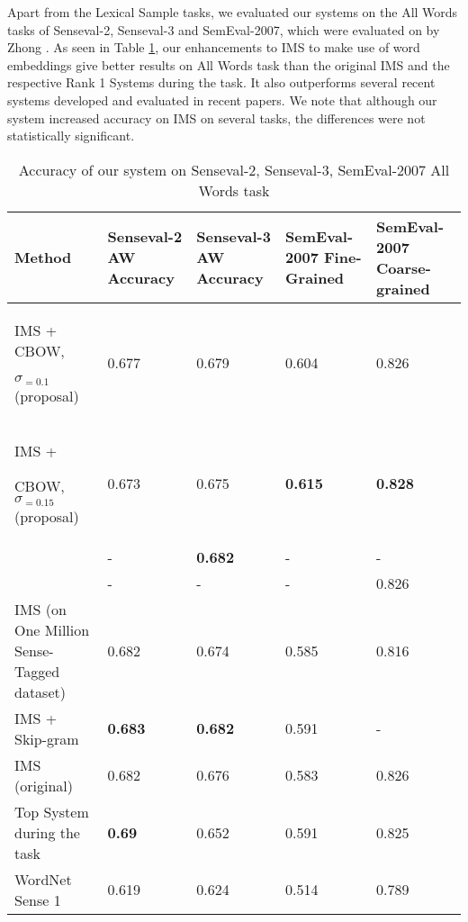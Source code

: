Apart from the Lexical Sample tasks, we evaluated our systems on the All Words tasks of Senseval-2, Senseval-3 and SemEval-2007, which were evaluated on by Zhong . As seen in Table \ref{table:All-AW}, our enhancements to IMS to make use of word embeddings give better results on All Words task than the original IMS and the respective Rank 1 Systems during the task. It also outperforms several recent systems developed and evaluated in recent papers. We note that although our system increased accuracy on IMS on several
tasks, the differences were not statistically significant.

\begin{table}
	\caption{Accuracy of our system on Senseval-2, Senseval-3, SemEval-2007 All Words task}
	\label{table:All-AW}
	\begin{center}
		\begin{tabular}{| p{4cm} | p{2cm} | p{3cm} | p{3cm} | p{3cm} | }
			\hline
			Method & Senseval-2 AW Accuracy & Senseval-3 AW Accuracy & SemEval-2007 Fine-Grained & SemEval-2007 Coarse-grained \\
			\hline
			IMS + CBOW, 
			
			$\sigma _{=0.1}$ (proposal) & 0.677 & 0.679 & 0.604 & 0.826  \\
			\hline
            IMS + 
			
			CBOW, $\sigma _{=0.15}$ (proposal) & 0.673 & 0.675 & {\bf0.615} & {\bf 0.828 } \\
			\hline
			
			\cite{Taghipour15} & -& {\bf0.682} & - & - \\
			\hline
			\cite{chen2014} & - & - & - & 0.826  \\
			\hline
			IMS (on One Million Sense-Tagged dataset) & 0.682 & 0.674 & 0.585 & 0.816 \\
            \hline
            IMS + Skip-gram \cite{Iacobacci2016}  & {\bf0.683} & {\bf0.682} & 0.591 & - \\
			\hline
			IMS (original) & 0.682 & 0.676 & 0.583 & 0.826   \\
			\hline
			Top System during the task & {\bf0.69} & 0.652 & 0.591 & 0.825  \\
			\hline
			WordNet Sense 1 & 0.619 & 0.624 & 0.514 & 0.789\\
			\hline
		\end{tabular}
	\end{center}
\end{table}


